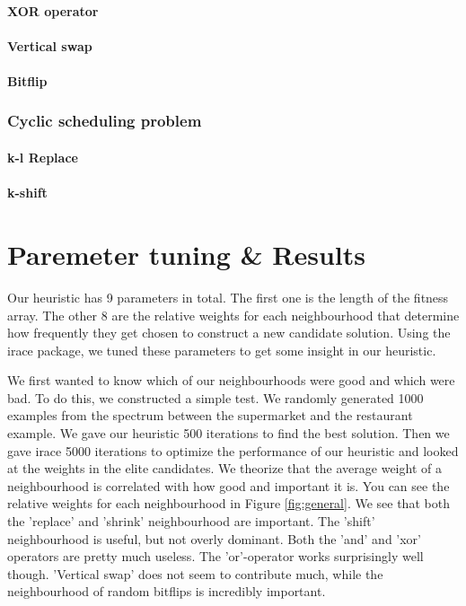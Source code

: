 \documentclass[]{article}
\begin{document}
\paragraph{XOR operator}
\paragraph{Vertical swap}
\paragraph{Bitflip}
\subsubsection{Cyclic scheduling problem}
\paragraph{k-l Replace}
\paragraph{k-shift}

\section{Paremeter tuning \& Results}
Our heuristic has 9 parameters in total. The first one is the length of the fitness array. The other 8 are the relative weights for each neighbourhood that determine how frequently they get chosen to construct a new candidate solution. Using the irace package, we tuned these parameters to get some insight in our heuristic.

We first wanted to know which of our neighbourhoods were good and which were bad. To do this, we constructed a simple test. We randomly generated 1000 examples from the spectrum between the supermarket and the restaurant example. We gave our heuristic 500 iterations to find the best solution. Then we gave irace 5000 iterations to optimize the performance of our heuristic and looked at the weights in the elite candidates. We theorize that the average weight of a neighbourhood is correlated with how good and important it is. You can see the relative weights for each neighbourhood in Figure \ref{fig:general}. We see that both the 'replace' and 'shrink' neighbourhood are important. The 'shift' neighbourhood is useful, but not overly dominant. Both the 'and' and 'xor' operators are pretty much useless. The 'or'-operator works surprisingly well though. 'Vertical swap' does not seem to contribute much, while the neighbourhood of random bitflips is incredibly important.
\end{document}

